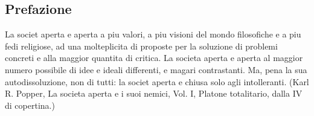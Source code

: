 \subsection*{Prefazione}

\begin{bash}
La societ aperta e aperta a piu valori, a piu visioni del mondo filosofiche e a piu fedi religiose, ad una molteplicita di proposte per la soluzione di problemi concreti e alla maggior quantita di critica. La societa aperta e aperta al maggior numero possibile di idee e ideali differenti, e magari contrastanti. Ma, pena la sua autodissoluzione, non di tutti: la societ aperta e chiusa solo agli intolleranti.
(Karl R. Popper, La societa aperta e i suoi nemici, Vol. I, Platone totalitario, dalla IV di copertina.)
\end{bash}

